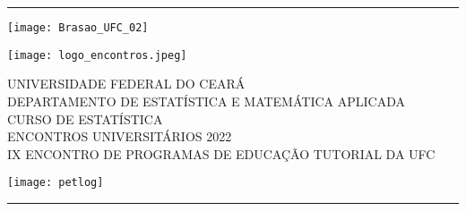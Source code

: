 \documentclass{sciposter}
\begin{document}
\begin{center}
\textcolor{blue}{\rule{74cm}{0.2mm}} \end{center}
\begin{minipage}{0.12\textwidth}
\texttt{[image: Brasao\_UFC\_02]} 
\end{minipage} %
\begin{minipage}{0.15\textwidth}
\texttt{[image: logo\_encontros.jpeg]}
\end{minipage} %
\hspace{0.7cm}
\begin{minipage}{0.5\textwidth}
\begin{flushleft}
\large UNIVERSIDADE FEDERAL DO CEARÁ\\
{\large DEPARTAMENTO DE ESTATÍSTICA E MATEMÁTICA APLICADA}\\
{\large CURSO DE ESTATÍSTICA}\\
{\large ENCONTROS UNIVERSITÁRIOS 2022}\\
{\large IX ENCONTRO DE PROGRAMAS DE EDUCAÇÃO TUTORIAL DA UFC}
\end{flushleft}
\end{minipage}%
\begin{minipage}{0.15\textwidth}
\texttt{[image: petlog]}
\end{minipage} %
\vspace{-0.55cm}
\begin{center}
\textcolor{blue}{\rule{74cm}{0.2mm}} \end{center}
\end{document}
